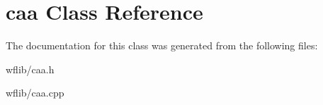 \hypertarget{classcaa}{\section{caa Class Reference}
\label{classcaa}
}


The documentation for this class was generated from the following files\-:\begin{DoxyCompactItemize}
\item 
wflib/caa.\-h\item 
wflib/caa.\-cpp\end{DoxyCompactItemize}
